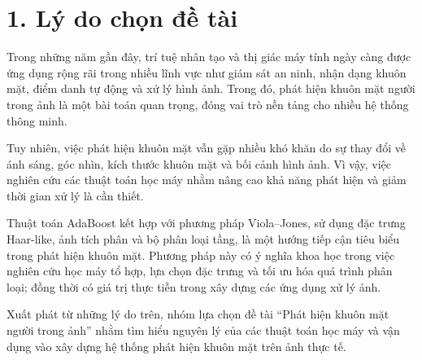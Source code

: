 \documentclass[12pt,a4paper,oneside]{report}
\begin{document}
\section*{1. Lý do chọn đề tài}
{Trong những năm gần đây, trí tuệ nhân tạo và thị giác máy tính ngày càng được ứng dụng rộng rãi trong nhiều lĩnh vực như giám sát an ninh, nhận dạng khuôn mặt, điểm danh tự động và xử lý hình ảnh. Trong đó, phát hiện khuôn mặt người trong ảnh là một bài toán quan trọng, đóng vai trò nền tảng cho nhiều hệ thống thông minh.

Tuy nhiên, việc phát hiện khuôn mặt vẫn gặp nhiều khó khăn do sự thay đổi về ánh sáng, góc nhìn, kích thước khuôn mặt và bối cảnh hình ảnh. Vì vậy, việc nghiên cứu các thuật toán học máy nhằm nâng cao khả năng phát hiện và giảm thời gian xử lý là cần thiết.

Thuật toán AdaBoost kết hợp với phương pháp Viola–Jones, sử dụng đặc trưng Haar-like, ảnh tích phân và bộ phân loại tầng, là một hướng tiếp cận tiêu biểu trong phát hiện khuôn mặt. Phương pháp này có ý nghĩa khoa học trong việc nghiên cứu học máy tổ hợp, lựa chọn đặc trưng và tối ưu hóa quá trình phân loại; đồng thời có giá trị thực tiễn trong xây dựng các ứng dụng xử lý ảnh.

Xuất phát từ những lý do trên, nhóm lựa chọn đề tài “Phát hiện khuôn mặt người trong ảnh” nhằm tìm hiểu nguyên lý của các thuật toán học máy và vận dụng vào xây dựng hệ thống phát hiện khuôn mặt trên ảnh thực tế.}
\end{document}
